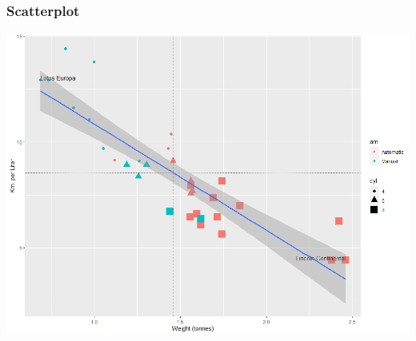 \documentclass[aspectratio=169]{beamer}
\begin{document}
\begin{frame}
\frametitle{Scatterplot}

\begin{center}
\includegraphics[height=.8\textheight]{scatterplot}
\end{center}

\end{frame}
\end{document}
